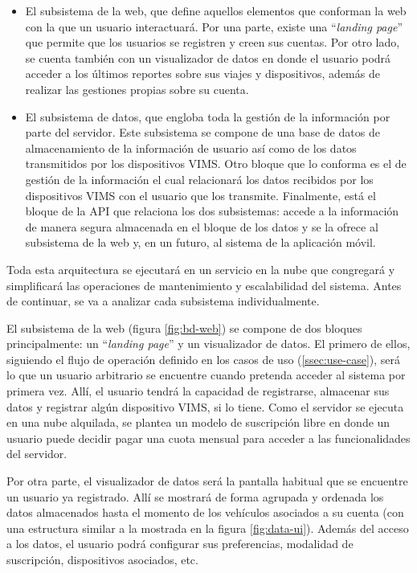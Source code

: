 \begin{itemize}
  \item El subsistema de la web, que define aquellos elementos que conforman la
        web con la que un usuario interactuará. Por una parte, existe una
        ``\textit{landing page}'' que permite que los usuarios se registren y
        creen sus cuentas. Por otro lado, se cuenta también con un visualizador
        de datos en donde el usuario podrá acceder a los últimos reportes
        sobre sus viajes y dispositivos, además de realizar las gestiones propias
        sobre su cuenta.
  \item El subsistema de datos, que engloba toda la gestión de la información
        por parte del servidor. Este subsistema se compone de una base de datos
        de almacenamiento de la información de usuario así como de los datos
        transmitidos por los dispositivos \ac{VIMS}. Otro bloque que lo conforma
        es el de gestión de la información el cual relacionará los datos recibidos
        por los dispositivos \ac{VIMS} con el usuario que los transmite. Finalmente,
        está el bloque de la \ac{API} que relaciona los dos subsistemas: accede a la
        información de manera segura almacenada en el bloque de los datos y se la
        ofrece al subsistema de la web y, en un futuro, al sistema de la aplicación
        móvil.
\end{itemize}

Toda esta arquitectura se ejecutará en un servicio en la nube que congregará y
simplificará las operaciones de mantenimiento y escalabilidad del sistema. Antes
de continuar, se va a analizar cada subsistema individualmente.

El subsistema de la web (figura \ref{fig:bd-web}) se compone de dos bloques principalmente:
un ``\textit{landing page}'' y un visualizador de datos. El primero de ellos, siguiendo
el flujo de operación definido en los casos de uso (\ref{ssec:use-case}), será
lo que un usuario arbitrario se encuentre cuando pretenda acceder al sistema por
primera vez. Allí, el usuario tendrá la capacidad de registrarse, almacenar sus
datos y registrar algún dispositivo \ac{VIMS}, si lo tiene. Como el servidor se
ejecuta en una nube alquilada, se plantea un modelo de suscripción libre en donde
un usuario puede decidir pagar una cuota mensual para acceder a las funcionalidades
del servidor.

Por otra parte, el visualizador de datos será la pantalla habitual que se encuentre un
usuario ya registrado. Allí se mostrará de forma agrupada y ordenada los datos
almacenados hasta el momento de los vehículos asociados a su cuenta (con una
estructura similar a la mostrada en la figura \ref{fig:data-ui}). Además del acceso
a los datos, el usuario podrá configurar sus preferencias, modalidad de suscripción,
dispositivos asociados, etc.

